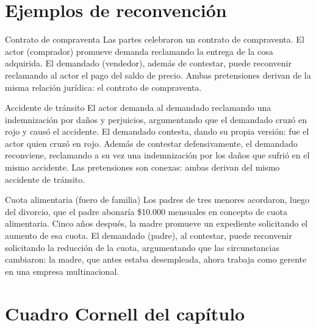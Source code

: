 \documentclass[12pt,oneside]{book}
\begin{document}
\section{Ejemplos de reconvención}

\begin{example}{Contrato de compraventa}
Las partes celebraron un contrato de compraventa. El actor (comprador) promueve demanda reclamando la entrega de la cosa adquirida. El demandado (vendedor), además de contestar, puede reconvenir reclamando al actor el pago del saldo de precio. Ambas pretensiones derivan de la misma relación jurídica: el contrato de compraventa.
\end{example}

\begin{example}{Accidente de tránsito}
El actor demanda al demandado reclamando una indemnización por daños y perjuicios, argumentando que el demandado cruzó en rojo y causó el accidente. El demandado contesta, dando su propia versión: fue el actor quien cruzó en rojo. Además de contestar defensivamente, el demandado reconviene, reclamando a su vez una indemnización por los daños que sufrió en el mismo accidente. Las pretensiones son conexas: ambas derivan del mismo accidente de tránsito.
\end{example}

\begin{example}{Cuota alimentaria (fuero de familia)}
Los padres de tres menores acordaron, luego del divorcio, que el padre abonaría \$10.000 mensuales en concepto de cuota alimentaria. Cinco años después, la madre promueve un expediente solicitando el aumento de esa cuota. El demandado (padre), al contestar, puede reconvenir solicitando la reducción de la cuota, argumentando que las circunstancias cambiaron: la madre, que antes estaba desempleada, ahora trabaja como gerente en una empresa multinacional.
\end{example}

\section*{Cuadro Cornell del capítulo}
\end{document}
